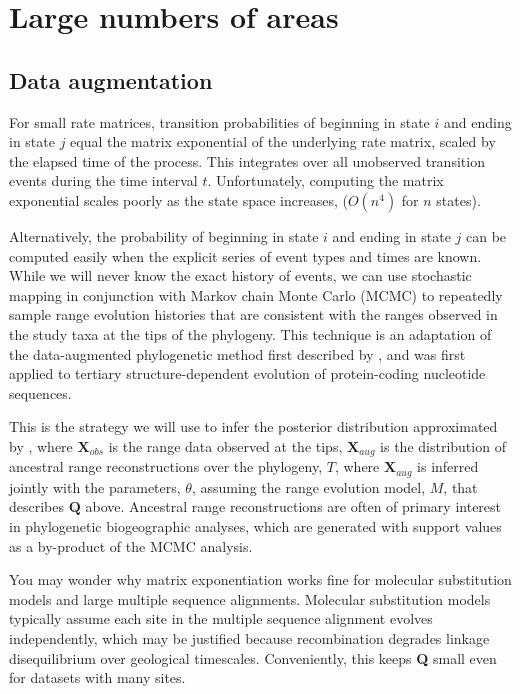 \section{Large numbers of areas}

\setlength{\parindent}{0pt}

\subsection{Data augmentation}

For small rate matrices, transition probabilities of beginning in state $i$ and ending in state $j$ equal the matrix exponential of the underlying rate matrix, scaled by the elapsed time of the process.
This integrates over all unobserved transition events during the time interval $t$.
Unfortunately, computing the matrix exponential scales poorly as the state space increases, ($O(n^4)$ for $n$ states).

Alternatively, the probability of beginning in state $i$ and ending in state $j$ can be computed easily when the explicit series of event types and times are known.
While we will never know the exact history of events, we can use stochastic mapping in conjunction with Markov chain Monte Carlo (MCMC) to repeatedly sample range evolution histories that are consistent with the ranges observed in the study taxa at the tips of the phylogeny.
This technique is an adaptation of the data-augmented phylogenetic method first described by \citet{robinson03}, and was first applied to tertiary structure-dependent evolution of protein-coding nucleotide sequences.

This is the strategy we will use to infer the posterior distribution approximated by 
, where $\textbf{X}_{obs}$ is the range data observed at the tips, $\textbf{X}_{aug}$ is the distribution of ancestral range reconstructions over the phylogeny, $T$, where $\textbf{X}_{aug}$ is inferred jointly with the parameters, $\theta$, assuming the range evolution model, $M$, that describes $\textbf{Q}$ above.
Ancestral range reconstructions are often of primary interest in phylogenetic biogeographic analyses, which are generated with support values as a by-product of the MCMC analysis.

You may wonder why matrix exponentiation works fine for molecular substitution models and large multiple sequence alignments.
Molecular substitution models typically assume each site in the multiple sequence alignment evolves independently, which may be justified because recombination degrades linkage disequilibrium over geological timescales.
Conveniently, this keeps \textbf{Q} small even for datasets with many sites.

